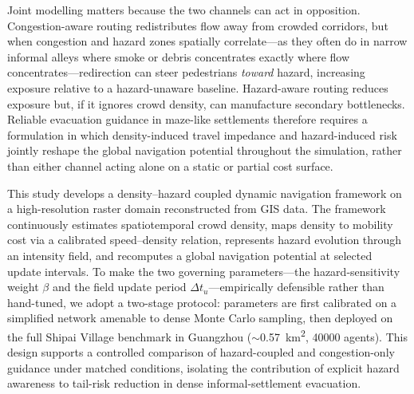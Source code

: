 \documentclass[preprint,12pt]{elsarticle}
\begin{document}
Joint modelling matters because the two channels can act in opposition.
Congestion-aware routing redistributes flow away from crowded corridors,
but when congestion and hazard zones spatially correlate---as they often
do in narrow informal alleys where smoke or debris concentrates exactly
where flow concentrates---redirection can steer pedestrians \emph{toward}
hazard, increasing exposure relative to a hazard-unaware baseline.
Hazard-aware routing reduces exposure but, if it ignores crowd density,
can manufacture secondary bottlenecks. Reliable evacuation guidance in
maze-like settlements therefore requires a formulation in which
density-induced travel impedance and hazard-induced risk jointly reshape
the global navigation potential throughout the simulation, rather than
either channel acting alone on a static or partial cost surface.

This study develops a density--hazard coupled dynamic navigation framework
on a high-resolution raster domain reconstructed from GIS data. The
framework continuously estimates spatiotemporal crowd density, maps
density to mobility cost via a calibrated speed--density relation,
represents hazard evolution through an intensity field, and recomputes a
global navigation potential at selected update intervals. To make the two
governing parameters---the hazard-sensitivity weight $\beta$ and the
field update period $\Delta t_u$---empirically defensible rather than
hand-tuned, we adopt a two-stage protocol: parameters are first calibrated
on a simplified network amenable to dense Monte Carlo sampling, then
deployed on the full Shipai Village benchmark in Guangzhou
($\sim$\SI{0.57}{km^{2}}, \num{40000} agents). This design supports a
controlled comparison of hazard-coupled and congestion-only guidance
under matched conditions, isolating the contribution of explicit hazard
awareness to tail-risk reduction in dense informal-settlement evacuation.
\end{document}
